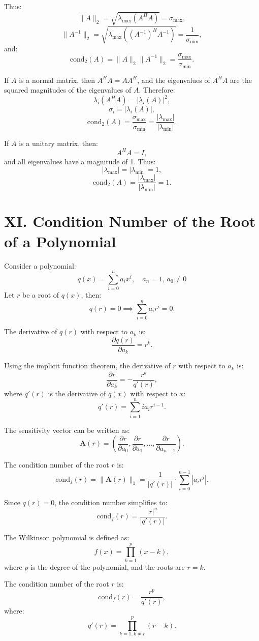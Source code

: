 \documentclass{article}
\begin{document}
Thus:
\[
\|A\|_2 = \sqrt{\lambda_{\max}(A^H A)} = \sigma_{\max},
\]
\[
\|A^{-1}\|_2 = \sqrt{\lambda_{\max}((A^{-1})^H A^{-1})} = \frac{1}{\sigma_{\min}},
\]
and:
\[
\text{cond}_2(A) = \|A\|_2 \|A^{-1}\|_2 = \frac{\sigma_{\max}}{\sigma_{\min}}.
\]

If \( A \) is a normal matrix, then \( A^H A = A A^H \), and the eigenvalues of \( A^H A \) are the squared magnitudes of the eigenvalues of \( A \). Therefore:
\[
\lambda_i(A^H A) = |\lambda_i(A)|^2,
\]
\[
\sigma_i = |\lambda_i(A)|,
\]
\[
\text{cond}_2(A) = \frac{\sigma_{\max}}{\sigma_{\min}} = \frac{|\lambda_{\max}|}{|\lambda_{\min}|}.
\]

If \( A \) is a unitary matrix, then:
\[
A^H A = I,
\]
and all eigenvalues have a magnitude of 1. Thus:
\[
|\lambda_{\max}| = |\lambda_{\min}| = 1,
\]
\[
\text{cond}_2(A) = \frac{|\lambda_{\max}|}{|\lambda_{\min}|} = 1.
\]


\section{XI. Condition Number of the Root of a Polynomial}
Consider a polynomial:
\[
q(x) = \sum_{i=0}^n a_i x^i, \quad a_n = 1, \, a_0 \neq 0
\]
Let \( r \) be a root of \( q(x) \), then:
\[
q(r) = 0 \implies \sum_{i=0}^n a_i r^i = 0.
\]

The derivative of \( q(r) \) with respect to \( a_k \) is:
\[
\frac{\partial q(r)}{\partial a_k} = r^k.
\]

Using the implicit function theorem, the derivative of \( r \) with respect to \( a_k \) is:
\[
\frac{\partial r}{\partial a_k} = -\frac{r^k}{q'(r)},
\]
where \( q'(r) \) is the derivative of \( q(x) \) with respect to \( x \):
\[
q'(r) = \sum_{i=1}^n i a_i r^{i-1}.
\]

The sensitivity vector can be written as:
\[
\mathbf{A}(r) = \left( \frac{\partial r}{\partial a_0}, \frac{\partial r}{\partial a_1}, \ldots, \frac{\partial r}{\partial a_{n-1}} \right).
\]

The condition number of the root \( r \) is:
\[
\text{cond}_f(r) = \|\mathbf{A}(r)\|_1 = \frac{1}{|q'(r)|} \cdot \sum_{i=0}^{n-1} |a_i r^i|.
\]

Since \( q(r) = 0 \), the condition number simplifies to:
\[
\text{cond}_f(r) = \frac{|r|^n}{|q'(r)|}.
\]

The Wilkinson polynomial is defined as:
\[
f(x) = \prod_{k=1}^p (x - k),
\]
where \( p \) is the degree of the polynomial, and the roots are \( r = k \).

The condition number of the root \( r \) is:
\[
\text{cond}_f(r) = \frac{r^p}{q'(r)},
\]
where:
\[
q'(r) = \prod_{k=1, k \neq r}^p (r - k).
\]
\end{document}
